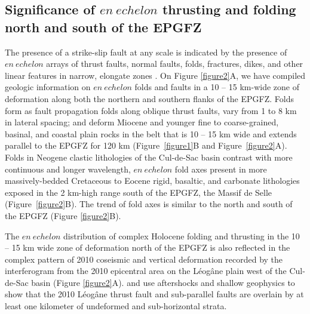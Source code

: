 \documentclass[linenumbers,draft]{agujournal}
\begin{document}
\subsection{Significance of $en~echelon$ thrusting and folding north and south of the EPGFZ}
The presence of a strike-slip fault at any scale is indicated by the presence of $en~echelon$ arrays of thrust faults, normal faults, folds, fractures, dikes, and other linear features in narrow, elongate zones \citep{sylvester1988strike}. On Figure \ref{figure2}A, we have compiled geologic information on $en~echelon$ folds and faults in a 10 -- 15 km-wide zone of deformation along both the northern and southern flanks of the EPGFZ. Folds form as fault propagation folds along oblique thrust faults, vary from 1 to 8 km in lateral spacing; and deform Miocene and younger fine to coarse-grained, basinal, and coastal plain rocks in the belt that is 10 -- 15 km wide and extends parallel to the EPGFZ for 120 km (Figure~\ref{figure1}B and Figure~\ref{figure2}A). Folds in Neogene clastic lithologies of the Cul-de-Sac basin contrast with more continuous and longer wavelength, $en~echelon$ fold axes present in more massively-bedded Cretaceous to Eocene rigid, basaltic, and carbonate lithologies exposed in the 2 km-high range south of the EPGFZ, the Massif de Selle (Figure~\ref{figure2}B). The trend of fold axes is similar to the north and south of the EPGFZ (Figure \ref{figure2}B). 

The $en~echelon$ distribution of complex Holocene folding and thrusting in the 10 -- 15 km wide zone of deformation north of the EPGFZ is also reflected in the complex pattern of 2010 coseismic and vertical deformation recorded by the interferogram from the 2010 epicentral area on the L\'eog\^ane plain west of the Cul-de-Sac basin \citep{hayes2010complex,hashimoto2011fan,bilham2013remote} (Figure \ref{figure2}A). \citet{douilly2013crustal,douilly2015three} and \citet{kocel2016near} use aftershocks and shallow geophysics to show that the 2010 L\'eog\^ane thrust fault and sub-parallel faults are overlain by at least one kilometer of undeformed and sub-horizontal strata.
\end{document}
